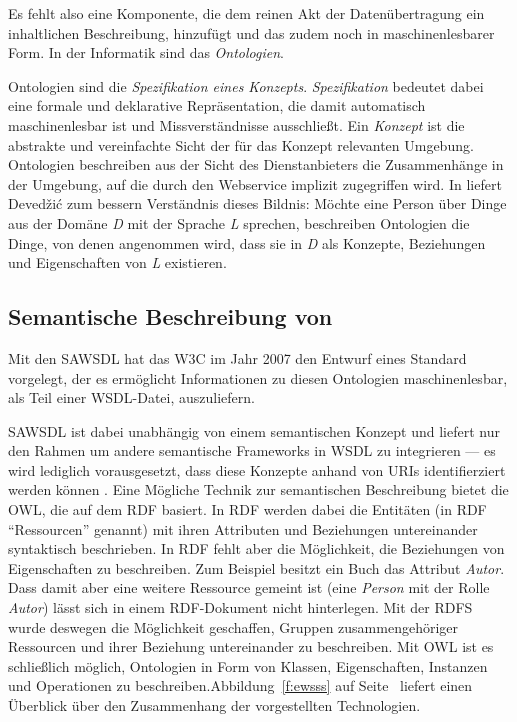 Es fehlt also eine Komponente, die dem reinen Akt der Datenübertragung ein inhaltlichen Beschreibung, hinzufügt und das zudem noch in maschinenlesbarer Form. In der Informatik sind das \emph{Ontologien}.

Ontologien sind die \emph{Spezifikation eines Konzepts}. \emph{Spezifikation} bedeutet dabei eine formale und deklarative Repräsentation, die damit automatisch maschinenlesbar ist und Missverständnisse ausschließt. Ein \emph{Konzept} ist die abstrakte und vereinfachte Sicht der für das Konzept relevanten Umgebung. Ontologien beschreiben aus der Sicht des Dienstanbieters die Zusammenhänge in der Umgebung, auf die durch den Webservice implizit zugegriffen wird. In \cite[S.31]{dcswe} liefert Devedžić zum bessern Verständnis dieses Bildnis: Möchte eine Person über Dinge aus der Domäne \emph{D} mit der Sprache \emph{L} sprechen, beschreiben Ontologien die Dinge, von denen angenommen wird, dass sie in \emph{D} als Konzepte, Beziehungen und Eigenschaften von \emph{L} existieren.

\subsection{Semantische Beschreibung von \ws}\label{l:sawsdl}

Mit den \ac{SAWSDL} hat das \ac{W3C} im Jahr 2007 den Entwurf eines Standard vorgelegt, der es ermöglicht Informationen zu diesen Ontologien maschinenlesbar, als Teil einer \ac{WSDL}-Datei, auszuliefern. 

\ac{SAWSDL} ist dabei unabhängig von einem semantischen Konzept und liefert nur den Rahmen um andere semantische Frameworks in \ac{WSDL} zu integrieren --- es wird lediglich vorausgesetzt, dass diese Konzepte anhand von URIs identifierziert werden können \cite[S.61]{ky-sawsdl}. Eine Mögliche Technik zur semantischen Beschreibung bietet die \ac{OWL}, die auf dem \ac{RDF} basiert. In \ac{RDF} werden dabei die Entitäten (in \ac{RDF} "`Ressourcen"' genannt) mit ihren Attributen und Beziehungen untereinander syntaktisch beschrieben. In \ac{RDF} fehlt aber die Möglichkeit, die Beziehungen von Eigenschaften zu beschreiben. Zum Beispiel besitzt ein Buch das Attribut \emph{Autor}. Dass damit aber eine weitere Ressource gemeint ist (eine \emph{Person} mit der Rolle \emph{Autor}) lässt sich in einem \ac{RDF}-Dokument nicht hinterlegen. Mit der \ac{RDFS} wurde deswegen die Möglichkeit geschaffen, Gruppen zusammengehöriger Ressourcen und ihrer Beziehung untereinander zu beschreiben. Mit \ac{OWL} ist es schließlich möglich, Ontologien in Form von Klassen, Eigenschaften, Instanzen und Operationen zu beschreiben.Abbildung~\ref{f:ewsss} auf Seite~\pageref{f:ewsss} liefert einen Überblick über den Zusammenhang der vorgestellten Technologien.

